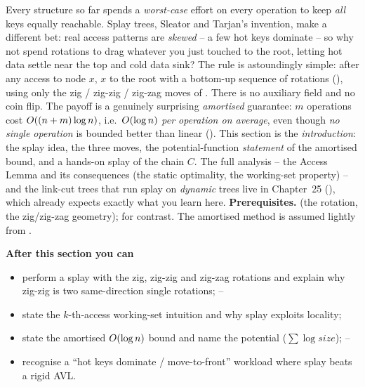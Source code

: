 \begin{topicintro}
Every structure so far spends a \emph{worst-case} effort on every operation to keep \emph{all} keys
equally reachable. Splay trees, Sleator and Tarjan's invention, make a different bet: real access
patterns are \emph{skewed} -- a few hot keys dominate -- so why not spend rotations to drag whatever you
just touched to the root, letting hot data settle near the top and cold data sink? The rule is
astoundingly simple: after any access to node $x$,  $x$ to the root with a bottom-up sequence
of rotations (), using only the zig / zig-zig / zig-zag moves of
. There is no auxiliary field and no coin flip. The payoff is a genuinely surprising
\emph{amortised} guarantee: $m$ operations cost $O((n+m)\log n)$, i.e.\ $O(\log n)$ \emph{per
operation on average}, even though \emph{no single operation} is bounded better than linear
(). This section is the \emph{introduction}: the splay idea, the three moves, the
potential-function \emph{statement} of the amortised bound, and a hands-on splay of the chain $C$. The
full analysis -- the Access Lemma and its consequences (the static optimality, the working-set
property) -- and the link-cut trees that run splay on \emph{dynamic} trees live in Chapter~25
(), which already expects exactly what you learn here.
\textbf{Prerequisites.}  (the rotation, the zig/zig-zag geometry); 
for contrast. The amortised method is assumed lightly from .

\textbf{After this section you can}
\begin{itemize}[nosep]
  \item perform a splay with the zig, zig-zig and zig-zag rotations and explain why zig-zig is two
        same-direction single rotations; \hfill{}--
  \item state the $k$-th-access working-set intuition and why splay exploits locality; \hfill{}
  \item state the amortised $O(\log n)$ bound and name the potential ($\sum \log \mathit{size}$); \hfill{}--
  \item recognise a ``hot keys dominate / move-to-front'' workload where splay beats a rigid AVL. \hfill{}
\end{itemize}
\end{topicintro}

